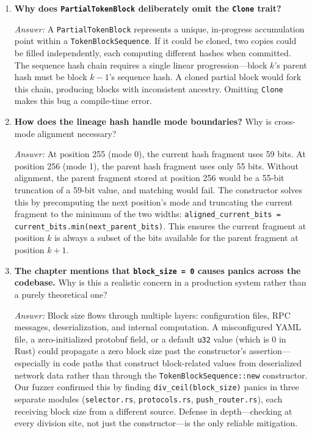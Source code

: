 \begin{enumerate}
  \textit{Answer:} The mode encoding allocates more bits to the local block hash when positions are small (mode 0: 54 bits for LBH) and trades LBH bits for position bits as positions grow (mode 3: 31 bits each). Since most sequences have fewer than 256 blocks, mode 0 applies to the vast majority of blocks, giving near-full 64-bit hash precision. A fixed 31-bit position field would waste 23 bits on every short-sequence block, reducing hash precision and increasing collision probability in the common case.

  \item \textbf{Why does \texttt{PartialTokenBlock} deliberately omit the \texttt{Clone} trait?}

  \textit{Answer:} A \texttt{PartialTokenBlock} represents a unique, in-progress accumulation point within a \texttt{TokenBlockSequence}. If it could be cloned, two copies could be filled independently, each computing different hashes when committed. The sequence hash chain requires a single linear progression---block $k$'s parent hash must be block $k-1$'s sequence hash. A cloned partial block would fork this chain, producing blocks with inconsistent ancestry. Omitting \texttt{Clone} makes this bug a compile-time error.

  \item \textbf{How does the lineage hash handle mode boundaries?} Why is cross-mode alignment necessary?

  \textit{Answer:} At position 255 (mode 0), the current hash fragment uses 59 bits. At position 256 (mode 1), the parent hash fragment uses only 55 bits. Without alignment, the parent fragment stored at position 256 would be a 55-bit truncation of a 59-bit value, and matching would fail. The constructor solves this by precomputing the next position's mode and truncating the current fragment to the minimum of the two widths: \texttt{aligned\_current\_bits = current\_bits.min(next\_parent\_bits)}. This ensures the current fragment at position $k$ is always a subset of the bits available for the parent fragment at position $k + 1$.

  \item \textbf{The chapter mentions that \texttt{block\_size = 0} causes panics across the codebase.} Why is this a realistic concern in a production system rather than a purely theoretical one?

  \textit{Answer:} Block size flows through multiple layers: configuration files, RPC messages, deserialization, and internal computation. A misconfigured YAML file, a zero-initialized protobuf field, or a default \texttt{u32} value (which is 0 in Rust) could propagate a zero block size past the constructor's assertion---especially in code paths that construct block-related values from deserialized network data rather than through the \texttt{TokenBlockSequence::new} constructor. Our fuzzer confirmed this by finding \texttt{div\_ceil(block\_size)} panics in three separate modules (\texttt{selector.rs}, \texttt{protocols.rs}, \texttt{push\_router.rs}), each receiving block size from a different source. Defense in depth---checking at every division site, not just the constructor---is the only reliable mitigation.
\end{enumerate}
